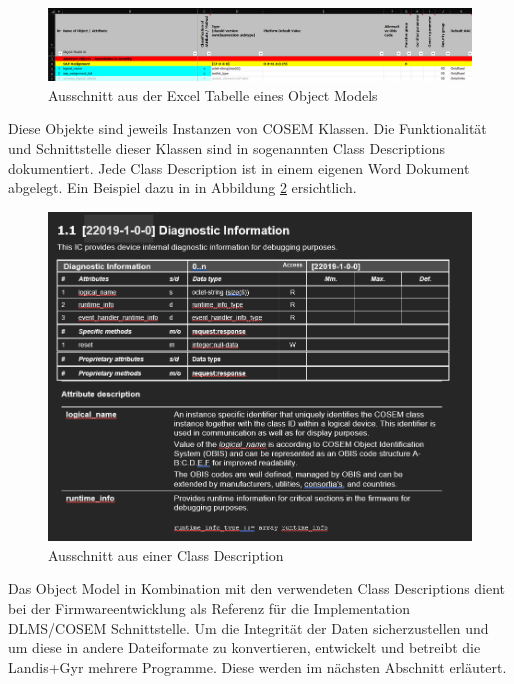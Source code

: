 \begin{figure}[H]
   \centering
   \includegraphics[width=1.0\textwidth]{gfx/objectModel.png}
   \caption{
       Ausschnitt aus der Excel Tabelle eines Object Models
   }
   \label{fig:objectModel}
\end{figure}

Diese Objekte sind jeweils Instanzen von \ac{COSEM} Klassen.
Die Funktionalität und Schnittstelle dieser Klassen sind in sogenannten Class Descriptions dokumentiert.
Jede Class Description ist in einem eigenen Word Dokument abgelegt.
Ein Beispiel dazu in in Abbildung \ref{fig:classDescription} ersichtlich.

\begin{figure}[H]
   \centering
   \includegraphics[width=1.0\textwidth]{gfx/ClassDescription.png}
   \caption{
       Ausschnitt aus einer Class Description
   }
   \label{fig:classDescription}
\end{figure}

Das Object Model in Kombination mit den verwendeten Class Descriptions dient bei der Firmwareentwicklung als Referenz für die Implementation \ac{DLMS}/\ac{COSEM} Schnittstelle.
Um die Integrität der Daten sicherzustellen und um diese in andere Dateiformate zu konvertieren, entwickelt und betreibt die Landis+Gyr mehrere Programme.
Diese werden im nächsten Abschnitt erläutert.

